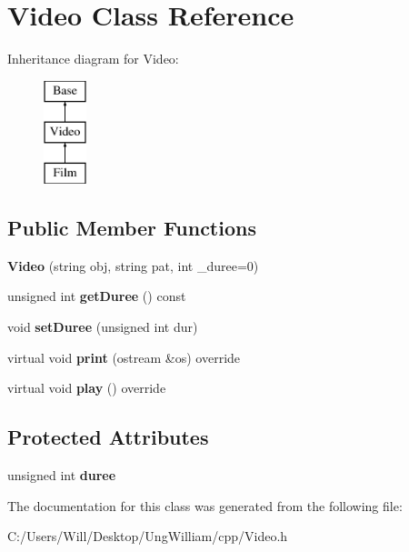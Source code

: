 \hypertarget{class_video}{}\section{Video Class Reference}
\label{class_video}
Inheritance diagram for Video\+:\begin{figure}[H]
\begin{center}
\leavevmode
\includegraphics[height=3.000000cm]{class_video}
\end{center}
\end{figure}
\subsection*{Public Member Functions}
\begin{DoxyCompactItemize}
\item 
{\bfseries Video} (string obj, string pat, int \+\_\+duree=0)\hypertarget{class_video_ae95cc353bcad4987de49bfe8dfb6c4fb}{}\label{class_video_ae95cc353bcad4987de49bfe8dfb6c4fb}

\item 
unsigned int {\bfseries get\+Duree} () const \hypertarget{class_video_ac9ed820535234a8c6520f68a60e72a61}{}\label{class_video_ac9ed820535234a8c6520f68a60e72a61}

\item 
void {\bfseries set\+Duree} (unsigned int dur)\hypertarget{class_video_a42f10c74a3bf8839d19ab9b1e8954f0a}{}\label{class_video_a42f10c74a3bf8839d19ab9b1e8954f0a}

\item 
virtual void {\bfseries print} (ostream \&os) override\hypertarget{class_video_ae527f70f5ddf9195d45b33710af6cdb7}{}\label{class_video_ae527f70f5ddf9195d45b33710af6cdb7}

\item 
virtual void {\bfseries play} () override\hypertarget{class_video_a70e78dc07cccb122b0a387488f9f7d8e}{}\label{class_video_a70e78dc07cccb122b0a387488f9f7d8e}

\end{DoxyCompactItemize}
\subsection*{Protected Attributes}
\begin{DoxyCompactItemize}
\item 
unsigned int {\bfseries duree}\hypertarget{class_video_a16ecfab926b5c3532b02471653212ed8}{}\label{class_video_a16ecfab926b5c3532b02471653212ed8}

\end{DoxyCompactItemize}


The documentation for this class was generated from the following file\+:\begin{DoxyCompactItemize}
\item 
C\+:/\+Users/\+Will/\+Desktop/\+Ung\+William/cpp/Video.\+h\end{DoxyCompactItemize}
